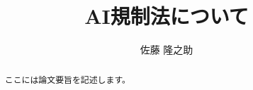 \documentclass[bachelor]{INIAD}%
\title{AI規制法について}
\author{佐藤 隆之助}
\begin{document}
\maketitle%

\frontmatter%



\begin{abstract}%
 ここには論文要旨を記述します。
\end{abstract}



{\makeatletter
\let\ps@jpl@in\ps@empty
\makeatother
\pagestyle{empty}
\tableofcontents
\clearpage}

\mainmatter%

      








\backmatter%


\appendix%
\end{document}
